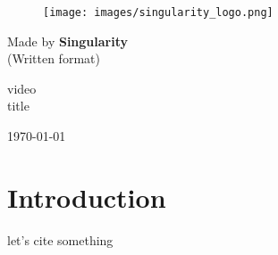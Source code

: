 \documentclass{article}
\begin{document}
	
	
\begin{titlepage}
	\begin{center}
		\begin{figure}[htb!]
			\centering
			\texttt{[image: images/singularity\_logo.png]}
		\end{figure}
		\vspace{20pt}
		\LARGE{Made by \textbf{Singularity }\\
		(Written format)}\\
		
		\vspace{150pt}
		
		
		
		\LARGE video \\
		title
		
		
		
		\vspace{30pt}
		\vspace{\fill}  
		\Large {\today}
		
	\end{center}
\end{titlepage}
	
	
	
	
\newpage
\tableofcontents
\listoffigures
\listoftables
\listoflistings
\newpage
\section{Introduction}
let's cite something \cite{wolf2011introduction}




\end{document}
